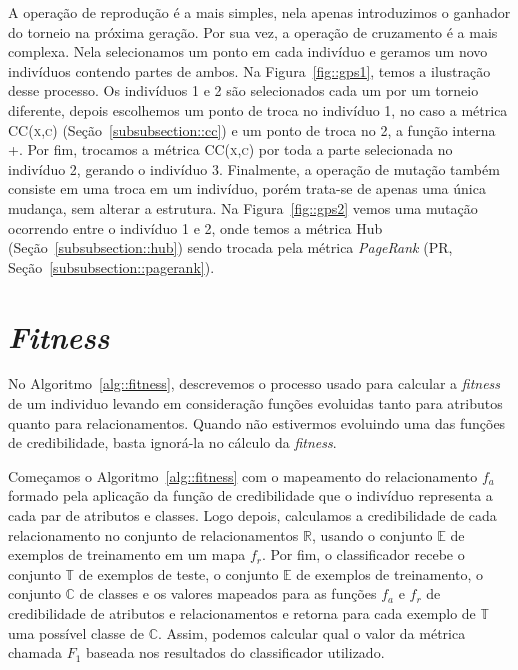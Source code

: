 A operação de reprodução é a mais simples, nela apenas introduzimos o ganhador do torneio na próxima geração. Por sua vez, a operação de cruzamento é a mais complexa. Nela selecionamos um ponto em cada indivíduo e geramos um novo indivíduos contendo partes de ambos. Na Figura~\ref{fig::gps1}, temos a ilustração desse processo. 
Os indivíduos 1 e 2 são selecionados cada um por um torneio diferente, depois escolhemos um ponto de troca no indivíduo 1, no caso a métrica \textsc{CC(x,c)} (Seção~\ref{subsubsection::cc}) e um ponto de troca no 2, a função interna +. Por fim, trocamos a métrica \textsc{CC(x,c)} por toda a parte selecionada no indivíduo 2, gerando o indivíduo 3. Finalmente, a operação de mutação também consiste em uma troca em um indivíduo, porém trata-se de apenas uma única mudança, sem alterar a estrutura. Na Figura~\ref{fig::gps2} vemos uma mutação ocorrendo entre o indivíduo 1 e 2, onde temos a métrica Hub (Seção~\ref{subsubsection::hub}) sendo trocada pela métrica \textit{PageRank} (\textsc{PR}, Seção~\ref{subsubsection::pagerank}).


\section{\textit{Fitness}}
\label{subsec::fitness}

No Algoritmo~\ref{alg::fitness}, descrevemos o processo usado para calcular a \textit{fitness} de um individuo levando em consideração funções evoluidas tanto para atributos quanto para relacionamentos.
Quando não estivermos evoluindo uma das funções de credibilidade, basta ignorá-la no cálculo da \textit{fitness}.

Começamos o Algoritmo~\ref{alg::fitness} com o mapeamento do relacionamento $f_a$ formado pela aplicação da função de credibilidade que o indivíduo representa a cada par de atributos e classes.
Logo depois, calculamos a credibilidade de cada relacionamento no conjunto de relacionamentos $\mathbb{R}$, usando o conjunto $\mathbb{E}$ de exemplos de treinamento em um mapa $f_r$.
Por fim, o classificador recebe o conjunto $\mathbb{T}$ de exemplos de teste, o conjunto $\mathbb{E}$ de exemplos de treinamento, o conjunto $\mathbb{C}$ de classes e os valores mapeados para as funções $f_a$ e $f_r$ de credibilidade de atributos e relacionamentos e retorna para cada exemplo de $\mathbb{T}$ uma possível classe de $\mathbb{C}$.
Assim, podemos calcular qual o valor da métrica chamada \textit{$F_1$} baseada nos resultados do classificador utilizado. 

